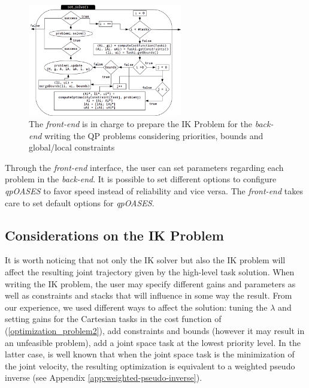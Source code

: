 \begin{figure}[htb!] 
\centering 
\includegraphics[width=0.6\textwidth]{images/wholebody/QPOases_sot_solve2.png} 
\caption{The \emph{front-end} is in charge to prepare the IK Problem for the \emph{back-end} writing the QP problems considering priorities, bounds and global/local constraints} 
\label{qpOasesSoT}
\end{figure}

Through the \emph{front-end} interface, the user can set parameters regarding each problem in the \emph{back-end}. It is possible to set different options to configure \emph{qpOASES} to favor speed instead of reliability and vice versa. The \emph{front-end} takes care to set default options for \emph{qpOASES}.  

\subsection{Considerations on the IK Problem}
It is worth noticing that not only the IK solver but also the IK problem will affect the resulting joint trajectory given by the high-level task solution.
When writing the IK problem, the user may specify different gains and parameters as well as constraints and stacks that will influence in some way the result. From our experience, we used different ways to affect the solution: tuning the $\lambda$ and setting gains for the Cartesian tasks in the cost function of (\ref{optimization_problem2}), add constraints and bounds (however it may result in an unfeasible problem), add a joint space task at the lowest priority level. In the latter case, is well known that when the joint space task is the minimization of the joint velocity, the resulting optimization is equivalent to a weighted pseudo inverse \cite{Siciliano:2008:RMP:1524151} (see Appendix \ref{app:weighted-pseudo-inverse}).



